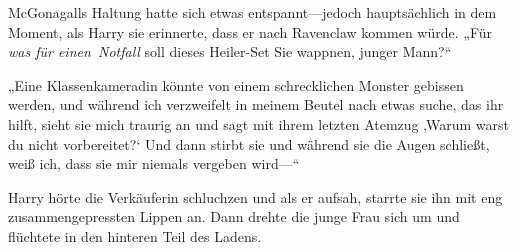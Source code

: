 McGonagalls Haltung hatte sich etwas entspannt—jedoch hauptsächlich in dem Moment, als Harry sie erinnerte, dass er nach Ravenclaw kommen würde. „Für \emph{was für einen\linebreak\ Notfall} soll dieses Heiler-Set Sie wappnen, junger Mann?“

„Eine Klassenkameradin könnte von einem schrecklichen Monster gebissen werden, und während ich verzweifelt in meinem Beutel nach etwas suche, das ihr hilft, sieht sie mich traurig an und sagt mit ihrem letzten Atemzug ‚Warum warst du nicht vorbereitet?‘ Und dann stirbt sie und während sie die Augen schließt, weiß ich, dass sie mir niemals vergeben wird—“

Harry hörte die Verkäuferin schluchzen und als er aufsah, starrte sie ihn mit eng zusammengepressten Lippen an. Dann drehte die junge Frau sich um und flüchtete in den hinteren Teil des Ladens.

